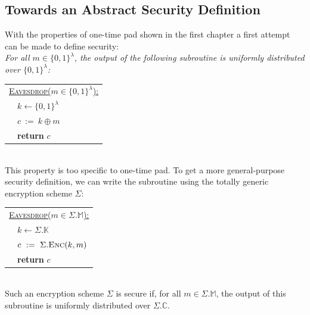 \documentclass{article}
\begin{document}
\begin{adjustwidth}{2em}{}
			\subsection{Towards an Abstract Security Definition}
			\begin{adjustwidth}{2em}{4em}
				With the properties of one-time pad shown in the first chapter a first attempt can be made to define security: \\
				\textit{For all $m \in \{ 0,1 \}^{\lambda}$, the output of the following subroutine is uniformly distributed over $\{ 0,1 \}^{\lambda}$:}
				\begin{center}
					\begin{tabular}{|l|}
						\hline
						\underline{\textsc{Eavesdrop}($m \in \{ 0,1 \}^{\lambda}$):} \\
						\ \ $k \leftarrow \{ 0,1 \}^{\lambda}$ \\
						\ \ $c \ := \ k \oplus m$ \\
						\ \ \textbf{return} $c$ \\
						\hline
					\end{tabular}
				\end{center}
				\hfill \\
				This property is too specific to one-time pad. To get a more general-purpose security definition, we can write the subroutine using the totally generic encryption scheme $\Sigma$: \\
				\begin{center}
					\begin{tabular}{|l|}
						\hline
						\underline{\textsc{Eavesdrop}($m \in \Sigma.\mathbb{M}$):} \\
						\ \ $k \leftarrow \Sigma.\mathbb{K}$ \\
						\ \ $c \ := \ \Sigma.\textsc{Enc}(k,m)$ \\
						\ \ \textbf{return} $c$ \\
						\hline
					\end{tabular}
				\end{center}
				\hfill \\
				Such an encryption scheme $\Sigma$ is secure if, for all $m \in \Sigma.\mathbb{M}$, the output of this subroutine is uniformly distributed over $\Sigma.\mathbb{C}$. 

\end{adjustwidth}
\end{adjustwidth}
\end{document}
